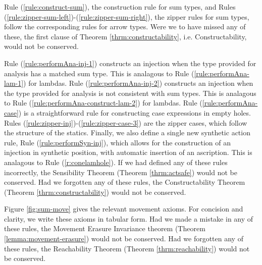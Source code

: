 Rule (\ref{rule:construct-sum}), the construction rule for sum types, and Rules (\ref{rule:zipper-sum-left})-(\ref{rule:zipper-sum-right}), the zipper rules for sum types, follow the corresponding rules for arrow types. Were we to have missed any of these, the first clause of Theorem \ref{thrm:constructability},  i.e. Constructability, would not be conserved.

Rule (\ref{rule:performAna-inj-1}) constructs an injection when the type provided for analysis has a matched sum type. This is analagous to Rule (\ref{rule:performAna-lam-1}) for lambdas. Rule (\ref{rule:performAna-inj-2}) constructs an injection when the type provided for analysis is not consistent with sum types. This is analagous to Rule (\ref{rule:performAna-construct-lam-2}) for lambdas. Rule (\ref{rule:performAna-case}) is a straightforward rule for constructing case expressions in empty holes. Rules (\ref{rule:zipper-inj})-(\ref{rule:zipper-case-3}) are the zipper cases, which follow the structure of the statics. Finally, we also define a single new synthetic action rule, Rule (\ref{rule:performSyn-inj}), which allows for the construction of an injection in synthetic position, with automatic insertion of an ascription. This is analagous to Rule (\ref{r:conelamhole}). If we had defined any of these rules incorrectly, the Sensibility Theorem (Theorem \ref{thrm:actsafe}) would not be conserved. Had we forgotten any of these rules, the Constructability Theorem (Theorem \ref{thrm:constructability}) would not be conserved. 

Figure \ref{fig:sum-move} gives the relevant movement axioms. For concision and clarity, we write these axioms in tabular form. Had we made a mistake in any of these rules, the Movement Erasure Invariance theorem (Theorem \ref{lemma:movement-erasure}) would not be conserved. Had we forgotten any of these rules, the Reachability Theorem (Theorem \ref{thrm:reachability}) would not be conserved.

